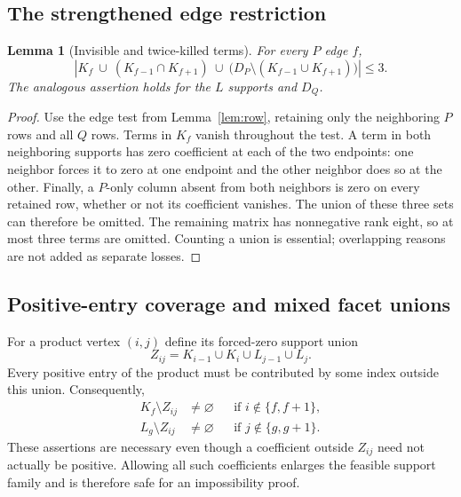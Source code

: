 \documentclass[11pt,a4paper]{article}
\newtheorem{lemma}[theorem]{Lemma}
\theoremstyle{definition}\newtheorem{definition}[theorem]{Definition}
\theoremstyle{remark}\newtheorem{remark}[theorem]{Remark}
\begin{document}
\subsection{The strengthened edge restriction}
\begin{lemma}[Invisible and twice-killed terms]\label{lem:edge}
For every $P$ edge $f$,
\begin{equation}\label{eq:edge}
 \left|K_f\ \cup\ (K_{f-1}\cap K_{f+1})\ \cup\
 \bigl(D_P\setminus(K_{f-1}\cup K_{f+1})\bigr)\right|\le3.
\end{equation}
The analogous assertion holds for the $L$ supports and $D_Q$.
\end{lemma}
\begin{proof}
Use the edge test from Lemma~\ref{lem:row}, retaining only the neighboring
$P$ rows and all $Q$ rows. Terms in $K_f$ vanish throughout the test. A term
in both neighboring supports has zero coefficient at each of the two
endpoints: one neighbor forces it to zero at one endpoint and the other
neighbor does so at the other. Finally, a $P$-only column absent from both
neighbors is zero on every retained row, whether or not its coefficient
vanishes. The union of these three sets can therefore be omitted. The
remaining matrix has nonnegative rank eight, so at most three terms are
omitted. Counting a union is essential; overlapping reasons are not added
as separate losses.
\end{proof}

\subsection{Positive-entry coverage and mixed facet unions}
For a product vertex $(i,j)$ define its forced-zero support union
\[
 Z_{ij}=K_{i-1}\cup K_i\cup L_{j-1}\cup L_j.
\]
Every positive entry of the product must be contributed by some index outside
this union. Consequently,
\begin{align}
 K_f\setminus Z_{ij}&\ne\varnothing
       &&\text{if }i\notin\{f,f+1\},\label{eq:coverageP}\\
 L_g\setminus Z_{ij}&\ne\varnothing
       &&\text{if }j\notin\{g,g+1\}.\label{eq:coverageQ}
\end{align}
These assertions are necessary even though a coefficient outside $Z_{ij}$
need not actually be positive. Allowing all such coefficients enlarges the
feasible support family and is therefore safe for an impossibility proof.
\end{document}
